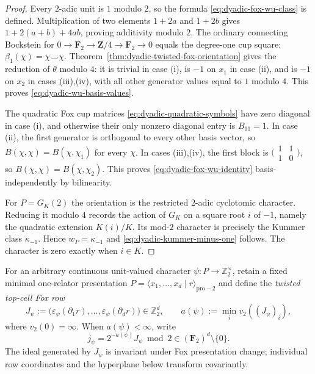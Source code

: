 \begin{proof}
Every $2$-adic unit is $1$ modulo $2$, so the formula
\eqref{eq:dyadic-fox-wu-class} is defined.  Multiplication
of two elements $1+2a$ and $1+2b$ gives
$1+2(a+b)+4ab$, proving additivity modulo $2$.
The ordinary connecting Bockstein for
$0\to\mathbf F_2\to\mathbf Z/4\to\mathbf F_2\to0$
equals the degree-one cup square:
$\beta_1(\chi)=\chi\smile\chi$.
Theorem~\ref{thm:dyadic-twisted-fox-orientation}
gives the reduction of $\theta$ modulo $4$:
it is trivial in case (i), is $-1$ on $x_1$ in
case (ii), and is $-1$ on $x_2$ in
cases (iii),(iv), with all other generator values
equal to $1$ modulo $4$.
This proves \eqref{eq:dyadic-wu-basis-values}.

The quadratic Fox cup matrices
\eqref{eq:dyadic-quadratic-symbols}
have zero diagonal in case (i), and otherwise
their only nonzero diagonal entry is $B_{11}=1$.
In case (ii), the first generator is orthogonal
to every other basis vector, so
$B(\chi,\chi)=B(\chi,\chi_1)$ for every $\chi$.
In cases (iii),(iv), the first block is
$\bigl(\begin{smallmatrix}1&1\\1&0\end{smallmatrix}\bigr)$,
so $B(\chi,\chi)=B(\chi,\chi_2)$.
This proves \eqref{eq:dyadic-fox-wu-identity}
basis-independently by bilinearity.

For $P=G_K(2)$ the orientation is the restricted
$2$-adic cyclotomic character.  Reducing it modulo
$4$ records the action of $G_K$ on a square root
$i$ of $-1$, namely the quadratic extension
$K(i)/K$.  Its mod-$2$ character is precisely
the Kummer class $\kappa_{-1}$.  Hence
$w_P=\kappa_{-1}$ and
\eqref{eq:dyadic-kummer-minus-one} follows.
The character is zero exactly when $i\in K$.
\end{proof}

For an arbitrary continuous unit-valued character
$\psi:P\to\mathbb Z_2^\times$, retain a fixed
minimal one-relator presentation
$P=\langle x_1,\ldots,x_d\mid r\rangle_{\mathrm{pro}-2}$
and define the \emph{twisted top-cell Fox row}
\begin{equation}\label{eq:dyadic-psi-fox-row}
J_\psi:=
\bigl(\varepsilon_\psi(\partial_1r),\ldots,
\varepsilon_\psi(\partial_dr)\bigr)\in\mathbb Z_2^d,
\qquad
a(\psi):=\min_i v_2((J_\psi)_i),
\end{equation}
where $v_2(0)=\infty$.  When $a(\psi)<\infty$,
write
\begin{equation}\label{eq:dyadic-psi-leading-row}
j_\psi=
2^{-a(\psi)}J_\psi\bmod2
\in(\mathbf F_2)^d\setminus\{0\}.
\end{equation}
The ideal generated by $J_\psi$ is invariant under
Fox presentation change; individual row coordinates
and the hyperplane below transform covariantly.

